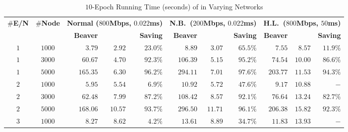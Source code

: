 \begin{table*}[!t]
 	\centering
 	\caption{$10$-Epoch Running Time (seconds) of \osmm in Varying Networks}
 	\label{table:time_smm_net_10}
 \setlength\tabcolsep{7pt}
 	 	\begin{tabular}{c|c|r|r|r|r|r|r|r|r|r}
 	 	\hline
 	\multirow{2}{*}{\textbf{$\#$E/N}} & 
 	\multirow{2}{*}{\textbf{$\#$Node}} & 
 	\multicolumn{3}{c|}{\textbf{Normal ($800$Mbps, $0.022$ms)}} & 
 	\multicolumn{3}{c|}{
 	\textbf{N.B.~($200$Mbps, $0.022$ms)}} & 
 	\multicolumn{3}{c}{
 	\textbf{H.L.~($800$Mbps, $50$ms)}}
 	\\\cline{3-11}
 	 & & \textbf{Beaver} & \osmm & \textbf{Saving} &
 	\textbf{Beaver} & \osmm & \textbf{Saving} &
 	\textbf{Beaver} & \osmm & \textbf{Saving} \\
 	 	\hline
 	$1$ & $1000$ & $3.79$ & $2.92 $ & {$23.0\%$} & $8.89$ &$3.07$ & {$65.5\%$} & $7.55$ &$8.57$ & {$11.9\% $} \\
 	$1$ & $3000$ & $60.67$ & $4.70$ & {$92.3\%$} & $106.39$ & $5.15$ & {$95.2\%$} & $74.54$ & $10.00$ & {$86.6\%$} \\
 	$1$ & $5000$ & $165.35$ & $6.30$ & {$\mathbf{96.2\%}$} & $294.11$ & $7.01$ & {$\mathbf{97.6\%}$} & $203.77$ & $11.53$ & {$\mathbf{94.3\%}$} \\
 	\hline
 	$2$ & $1000$ & $5.95$ & $5.54$ & {$6.9\%$} & $10.92$ & $5.72$ & {$47.6\%$} & $9.17$ & $10.88$ & {$-$} \\
 	$2$ & $3000$ & $62.48$ & $7.99$ & {$87.2\%$} & $108.42$ & $8.57$ & {$92.1\%$} & $76.64$ & $13.24$ & {$82.7\%$} \\
 	$2$ & $5000$ & $168.06$ & $10.57$ & {$\mathbf{93.7\%}$} & $296.50$ & $11.71$ & {$\mathbf{96.1\%}$} & $206.38$ & $15.82$ & {$\mathbf{92.3\%}$} \\
 	\hline
 	$3$ & $1000$ & $8.27$ & $8.62$ & {$4.2\%$} & $13.61$ & $8.89$ & {$34.7\%$} & $11.83$ & $13.93$ & {$-$} \\

\end{tabular}
\end{table*}
